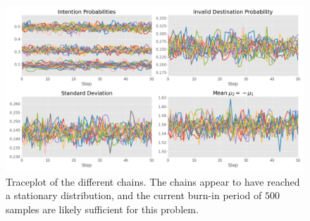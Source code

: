 \begin{figure}[h]
    \centering
    \includegraphics[width=\textwidth]{figures/example_mcmc_trace.png}
    \caption{Traceplot of the different chains. The chains appear to have reached a stationary distribution, and the current burn-in period of $500$ samples are likely sufficient for this problem.}
    \label{fig:example_mcmc_trace}
\end{figure}
